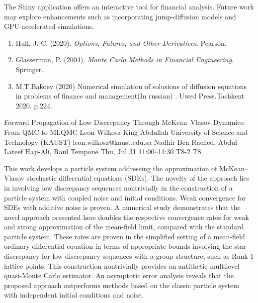 \begin{talk}
The Shiny application offers an interactive tool for financial analysis. Future work may explore enhancements such as incorporating jump-diffusion models and GPU-accelerated simulations.
\medskip

\begin{enumerate}
	\item Hull, J. C. (2020). \textit{Options, Futures, and Other Derivatives}. Pearson.
	\item Glasserman, P. (2004). \textit{Monte Carlo Methods in Financial Engineering}. Springer.
	\item M.T.Bakoev (2020) Numerical simulation of solusions of diffusion equations in problems of finance and management(In russian) . Uwed Press.Tashkent 2020. p.224.
	
\end{enumerate}

\end{talk}

\begin{talk}
  {Forward Propagation of Low Discrepancy Through McKean--Vlasov Dynamics: From QMC to MLQMC}%
  {Leon Wilkosz}%
  {King Abdullah University of Science and Technology (KAUST)}%
  {leon.wilkosz@kaust.edu.sa}%
  {Nadhir Ben Rached, Abdul-Lateef Haji-Ali, Raul Tempone}%
  {}%
  {Thu, Jul 31 11:00–11:30}%
  {T8-2}%
  {T8}%
  
				
			
This work develops a particle system addressing the approximation of \linebreak McKean--Vlasov stochastic differential equations (SDEs). The novelty of the approach lies in involving low discrepancy sequences nontrivially in the construction of a particle system with coupled noise and initial conditions. Weak convergence for SDEs with additive noise is proven. A numerical study demonstrates that the novel approach presented here doubles the respective convergence rates for weak and strong approximation of the mean-field limit, compared with the standard particle system. These rates are proven in the simplified setting of a mean-field ordinary differential equation in terms of appropriate bounds involving the star discrepancy for low discrepancy sequences with a group structure, such as Rank-1 lattice points. This construction nontrivially provides an antithetic multilevel quasi-Monte Carlo estimator. An asymptotic error analysis reveals that the proposed approach outperforms methods based on the classic particle system with independent initial conditions and noise.
\end{talk}

